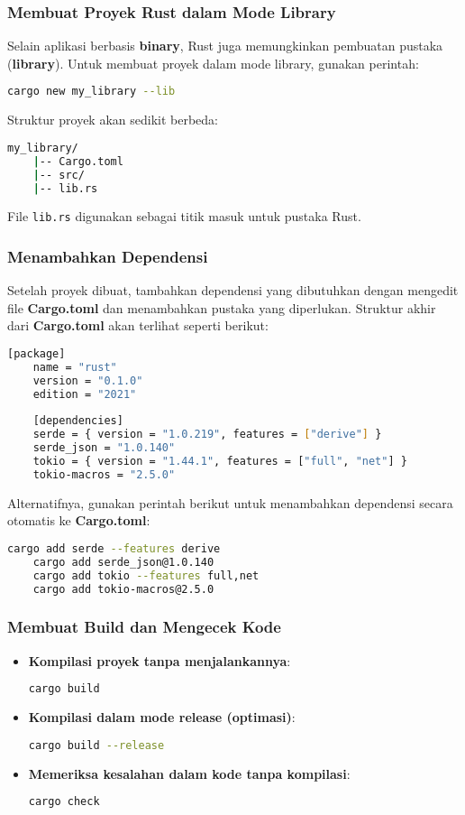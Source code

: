 \subsubsection{Membuat Proyek Rust dalam Mode Library}
Selain aplikasi berbasis \textbf{binary}, Rust juga memungkinkan pembuatan pustaka (\textbf{library}). Untuk membuat proyek dalam mode library, gunakan perintah:
\begin{lstlisting}[language=bash]
	cargo new my_library --lib
\end{lstlisting}
Struktur proyek akan sedikit berbeda:
\begin{lstlisting}[language=bash]
	my_library/
	|-- Cargo.toml
	|-- src/
	|-- lib.rs
\end{lstlisting}
File \texttt{lib.rs} digunakan sebagai titik masuk untuk pustaka Rust.

\subsubsection{Menambahkan Dependensi}
Setelah proyek dibuat, tambahkan dependensi yang dibutuhkan dengan mengedit file \textbf{Cargo.toml} dan menambahkan pustaka yang diperlukan. Struktur akhir dari \textbf{Cargo.toml} akan terlihat seperti berikut:

\begin{lstlisting}[language=bash]
	[package]
	name = "rust"
	version = "0.1.0"
	edition = "2021"
	
	[dependencies]
	serde = { version = "1.0.219", features = ["derive"] }
	serde_json = "1.0.140"
	tokio = { version = "1.44.1", features = ["full", "net"] }
	tokio-macros = "2.5.0"
\end{lstlisting}

Alternatifnya, gunakan perintah berikut untuk menambahkan dependensi secara otomatis ke \textbf{Cargo.toml}:

\begin{lstlisting}[language=bash]
	cargo add serde --features derive
	cargo add serde_json@1.0.140
	cargo add tokio --features full,net
	cargo add tokio-macros@2.5.0
\end{lstlisting}

\subsubsection{Membuat Build dan Mengecek Kode}
\begin{itemize}
	\item \textbf{Kompilasi proyek tanpa menjalankannya}:
	\begin{lstlisting}[language=bash]
		cargo build
	\end{lstlisting}
	\item \textbf{Kompilasi dalam mode release (optimasi)}:
	\begin{lstlisting}[language=bash]
		cargo build --release
	\end{lstlisting}
	\item \textbf{Memeriksa kesalahan dalam kode tanpa kompilasi}:
	\begin{lstlisting}[language=bash]
		cargo check
	\end{lstlisting}
\end{itemize}

